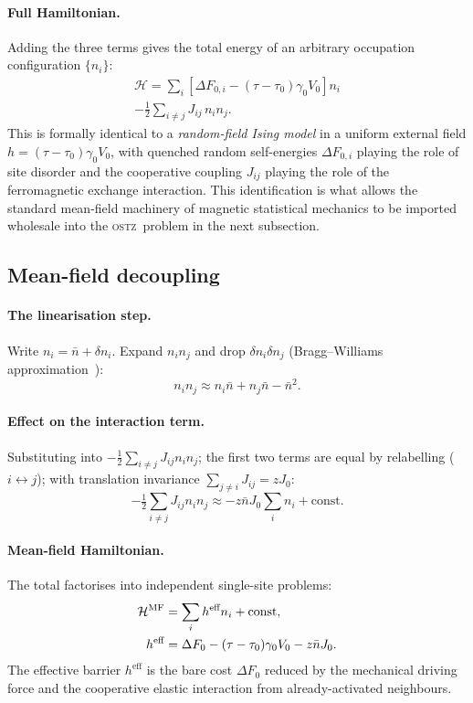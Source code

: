\documentclass[5p,sort&compress]{elsarticle}
\newcommand{\OSTZ}{\textsc{ostz}}
\newcommand{\dF}{\Delta F_0}
\newcommand{\gz}{\gamma_0}
\newcommand{\half}{\tfrac{1}{2}}
\begin{document}
\paragraph{Full Hamiltonian.}
Adding the three terms gives the total energy of an arbitrary
occupation configuration $\{n_i\}$:
\begin{multline}
  \mathcal H=\sum_i\!\left[\Delta F_{0,i}-(\tau-\tau_0)\gz V_0\right]n_i\\
  -\half\sum_{i\ne j}J_{ij}\,n_in_j.
  \label{eq:Hamiltonian}
\end{multline}
This is formally identical to a \emph{random-field Ising model} in a
uniform external field $h=(\tau-\tau_0)\gz V_0$, with quenched random
self-energies $\Delta F_{0,i}$ playing the role of site disorder and
the cooperative coupling $J_{ij}$ playing the role of the
ferromagnetic exchange interaction. This identification is what
allows the standard mean-field machinery of magnetic statistical
mechanics to be imported wholesale into the \OSTZ\ problem in the
next subsection.

\subsection{Mean-field decoupling}
\label{sec:MF}

\paragraph{The linearisation step.}
Write $n_i=\bar n+\delta n_i$. Expand $n_in_j$ and drop
$\delta n_i\delta n_j$ (Bragg--Williams approximation~\cite{bragg1934}):
\begin{equation}
  n_in_j\approx n_i\bar n+n_j\bar n-\bar n^2.
  \label{eq:BW}
\end{equation}

\paragraph{Effect on the interaction term.}
Substituting into $-\half\sum_{i\ne j}J_{ij}n_in_j$; the first two
terms are equal by relabelling ($i\leftrightarrow j$); with
translation invariance $\sum_{j\ne i}J_{ij}=zJ_0$:
\begin{equation}
  -\half\sum_{i\ne j}J_{ij}n_in_j\approx
  -z\bar nJ_0\sum_i n_i+\text{const.}
  \label{eq:MFinteraction}
\end{equation}

\paragraph{Mean-field Hamiltonian.}
The total factorises into independent single-site problems:
\begin{align}
  \mathcal H^\text{MF}&=\sum_i h^\text{eff}n_i+\text{const},
    \label{eq:heff}\\
  h^\text{eff}&=\dF-(\tau-\tau_0)\gz V_0-z\bar nJ_0.\notag
\end{align}
The effective barrier $h^\text{eff}$ is the bare cost $\dF$ reduced
by the mechanical driving force and the cooperative elastic
interaction from already-activated neighbours.
\end{document}
